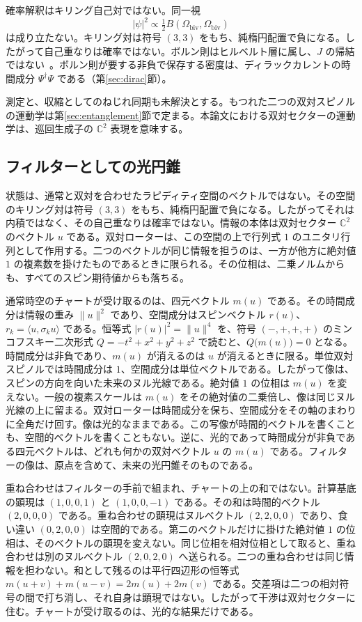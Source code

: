 \documentclass[a4paper]{article}
\begin{document}
確率解釈はキリング自己対ではない。同一視
\[
|\psi|^2 \propto \tfrac12 B(\Omega_{\mathrm{biv}},\Omega_{\mathrm{biv}})
\]
は成り立たない。キリング対は符号 $(3,3)$ をもち、純楕円配置で負になる。したがって自己重なりは確率ではない。ボルン則はヒルベルト層に属し、$J$ の帰結ではない~\cite{dst-d4l}。ボルン則が要する非負で保存する密度は、ディラックカレントの時間成分 $\Psi^\dagger\Psi$ である（第\ref{sec:dirac}節）。

測定と、収縮としてのねじれ同期も未解決とする。もつれた二つの双対スピノルの運動学は第\ref{sec:entanglement}節で定まる。本論文における双対セクターの運動学は、巡回生成子の $\mathbb{C}^2$ 表現を意味する。

\subsection{フィルターとしての光円錐}
\label{sec:lightfilter}

状態は、通常と双対を合わせたラピディティ空間のベクトルではない。その空間のキリング対は符号 $(3,3)$ をもち、純楕円配置で負になる。したがってそれは内積ではなく、その自己重なりは確率ではない。情報の本体は双対セクター $\mathbb{C}^2$ のベクトル $u$ である。双対ローターは、この空間の上で行列式 $1$ のユニタリ行列として作用する。二つのベクトルが同じ情報を担うのは、一方が他方に絶対値 $1$ の複素数を掛けたものであるときに限られる。その位相は、二乗ノルムからも、すべてのスピン期待値からも落ちる。

通常時空のチャートが受け取るのは、四元ベクトル $m(u)$ である。その時間成分は情報の重み $\lVert u\rVert^2$ であり、空間成分はスピンベクトル $r(u)$、$r_k=\langle u,\sigma_k u\rangle$ である。恒等式 $|r(u)|^2=\lVert u\rVert^4$ を、符号 $(-,+,+,+)$ のミンコフスキー二次形式 $Q=-t^2+x^2+y^2+z^2$ で読むと、$Q\bigl(m(u)\bigr)=0$ となる。時間成分は非負であり、$m(u)$ が消えるのは $u$ が消えるときに限る。単位双対スピノルでは時間成分は $1$、空間成分は単位ベクトルである。したがって像は、スピンの方向を向いた未来のヌル光線である。絶対値 $1$ の位相は $m(u)$ を変えない。一般の複素スケールは $m(u)$ をその絶対値の二乗倍し、像は同じヌル光線の上に留まる。双対ローターは時間成分を保ち、空間成分をその軸のまわりに全角だけ回す。像は光的なままである。この写像が時間的ベクトルを書くことも、空間的ベクトルを書くこともない。逆に、光的であって時間成分が非負である四元ベクトルは、どれも何かの双対ベクトル $u$ の $m(u)$ である。フィルターの像は、原点を含めて、未来の光円錐そのものである。

重ね合わせはフィルターの手前で組まれ、チャートの上の和ではない。計算基底の顕現は $(1,0,0,1)$ と $(1,0,0,-1)$ である。その和は時間的ベクトル $(2,0,0,0)$ である。重ね合わせの顕現はヌルベクトル $(2,2,0,0)$ であり、食い違い $(0,2,0,0)$ は空間的である。第二のベクトルだけに掛けた絶対値 $1$ の位相は、そのベクトルの顕現を変えない。同じ位相を相対位相として取ると、重ね合わせは別のヌルベクトル $(2,0,2,0)$ へ送られる。二つの重ね合わせは同じ情報を担わない。和として残るのは平行四辺形の恒等式 $m(u+v)+m(u-v)=2m(u)+2m(v)$ である。交差項は二つの相対符号の間で打ち消し、それ自身は顕現ではない。したがって干渉は双対セクターに住む。チャートが受け取るのは、光的な結果だけである。
\end{document}
